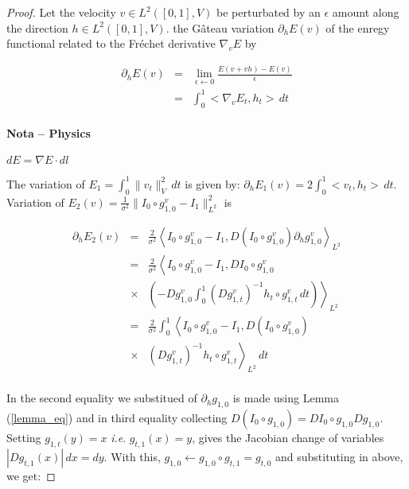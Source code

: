 \documentclass[final, paper=letter,5p,times,twocolumn]{elsarticle}
\theoremstyle{definition}
\begin{document}
\begin{proof}
  Let the velocity $v \in L^{2}([0,1],V)$ be perturbated by an $\epsilon$ amount along the direction $h \in L^{2}([0,1],V)$. the G\^ateau variation $\partial_{h}E(v)$ of the enregy functional related to the Fr\'echet derivative $\nabla_{v}E$ by

  \begin{equation*}
    \begin{array}{rcl}
      \partial_{h}E(v) & = & \underset{\epsilon \leftarrow 0}{\lim} \frac{E(v + vh) - E(v)}{\epsilon} \\
      & = & \int_{0}^{1} <\nabla_{v}E_{t}, h_{t}>\, dt 
      \end{array}
    \end{equation*}

    \paragraph{Nota -- Physics}{$dE = \nabla E \cdot dl$}

    The variation of $E_{1} = \int_{0}^{1} \| v_{t} \|_{V}^{2} \, dt$ is given by: $\partial_{h} E_{1}(v) = 2 \int_{0}^{1} <v_{t},h_{t}> \, dt$. Variation of $E_{2}(v) = \frac{1}{\sigma^{2}} \| I_{0} \circ g_{1,0}^{v} - I_{1}\|_{L^{2}}^{2}$ is

  \begin{equation*}
    \begin{array}{lcl}
      \partial_{h} E_{2}(v) & = & \frac{2}{\sigma^{2}} \left< I_{0} \circ g_{1,0}^{v} - I_{1}, D\left( I_{0} \circ g_{1,0}^{v} \right) \partial_{h} g_{1,0}^{v}  \right>_{L^{2}} \\
      & = & \frac{2}{\sigma^{2}} \left< I_{0} \circ g_{1,0}^{v} - I_{1}, D I_{0} \circ g_{1,0}^{v} \right . \\
      & \times & \left. \left( -D g_{1,0}^{v} \int_{0}^{1} \left( D g_{1,t}^{v} \right)^{-1} h_{t} \circ g_{1,t}^{v} \, dt \right) \right>_{L^{2}}\\
      & = & \frac{2}{\sigma^{2}} \int_{0}^{1} \left< I_{0} \circ g_{1,0}^{v} - I_{1}, D\left( I_{0} \circ g_{1,0}^{v} \right) \right . \\
      & \times & \left. \left( D g_{1,t}^{v} \right)^{-1} h_{t} \circ g_{1,t}^{v}\right>_{L^{2}} \, dt \\
      \end{array}
  \end{equation*}

  In the second equality we substitued of $\partial_{h} g_{1,0}$ is made using Lemma (\ref{lemma_eq}) and in third equality collecting $D(I_{0} \circ g_{1,0}) = DI_{0} \circ g_{1,0}Dg_{1,0}$. Setting $g_{1,t}(y) = x$ {\it i.e}. $g_{t,1}(x) = y$, gives the Jacobian change of variables $|D g_{t,1}(x)| \, dx = dy$. With this, $g_{1,0} \leftarrow g_{1,0} \circ g_{t,1} = g_{t,0}$ and substituting in above, we get:



\end{proof}
\end{document}
